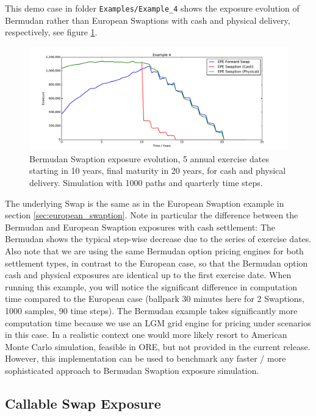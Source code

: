 \documentclass[12pt, a4paper]{article}
\begin{document}
{This demo case in folder {\tt Examples/Example\_4} shows the exposure evolution of Bermudan rather than European
Swaptions with cash and physical delivery, respectively, see figure \ref{fig_3b}.
\begin{figure}[h!]
\begin{center}
\includegraphics[scale=0.45]{mpl_bermudan_swaption.pdf}
\end{center}
\caption{Bermudan Swaption exposure evolution, 5 annual exercise dates starting in 10 years, final maturity in 20 years,
  for cash and physical delivery. Simulation with 1000 paths and quarterly time steps.}
\label{fig_3b}
\end{figure}
The underlying Swap is the same as in the European Swaption example in section \ref{sec:european_swaption}. Note in
particular the difference between the Bermudan and European Swaption exposures with cash settlement: The Bermudan shows
the typical step-wise decrease due to the series of exercise dates. Also note that we are using the same Bermudan option
pricing engines for both settlement types, in contrast to the European case, so that the Bermudan option cash and
physical exposures are identical up to the first exercise date. When running this example, you will notice the
significant difference in computation time compared to the European case (ballpark 30 minutes here for 2 Swaptions, 1000
samples, 90 time steps). The Bermudan example takes significantly more computation time because we use an LGM grid
engine for pricing under scenarios in this case. In a realistic context one would more likely resort to American Monte
Carlo simulation, feasible in ORE, but not provided in the current release. However, this implementation can be used to
benchmark any faster / more sophisticated approach to Bermudan Swaption exposure simulation.

\subsection{Callable Swap Exposure}

}
\end{document}
